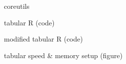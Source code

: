 \begin{frame}
		coreutils
\end{frame}

\begin{frame}
		tabular R (code)
\end{frame}

\begin{frame}
		modified tabular R (code)
\end{frame}

\begin{frame}
		tabular speed & memory setup (figure)
\end{frame}
